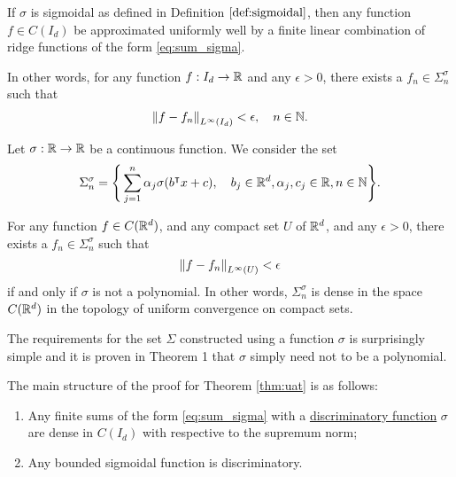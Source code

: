\begin{theorem}
    \label{thm:uat}
    If $\sigma$ is sigmoidal as defined in Definition $\ref{def:sigmoidal}$,
    then any function $f \in C(I_d)$ be approximated uniformly well by a finite
    linear combination of ridge functions of the form \eqref{eq:sum_sigma}.

    In other words, for any function $f: I_d \to \mathbb{R}$ and any $\epsilon > 0$,
    there exists a $f_n \in \Sigma_n^{\sigma}$ such that
    \begin{align}
        \left\| f - f_n \right\|_{L^{\infty}(I_d)} < \epsilon, \quad n \in \mathbb{N}.
    \end{align}
\end{theorem}

\begin{proposition}
    Let $\sigma: \mathbb{R} \to \mathbb{R}$ be a continuous function. We consider the set
    \begin{equation}
        \Sigma_n^{\sigma} = \Bigg\{
            \sum_{j=1}^n \alpha_j \sigma(b{}^{\intercal} x + c), \quad
            b_j \in \mathbb{R}^d, \alpha_j, c_j \in \mathbb{R}, n\in\mathbb{N}
        \Bigg\}.
    \end{equation}

    For any function $f \in C(\mathbb{R}^d)$, and any compact set $U$ of $\mathbb{R}^d$, and any
    $\epsilon > 0$, there exists a $f_n \in \Sigma_n^{\sigma}$ such that 
    \begin{equation}
        \left\| f - f_n \right\|_{L^{\infty}(U)} < \epsilon
    \end{equation}
    if and only if $\sigma$ is not a polynomial. In other words,
    $\Sigma_n^{\sigma}$ is dense in the space $C(\mathbb{R}^d)$ in the topology of
    uniform convergence on compact sets.
\end{proposition}

\begin{remark}
    The requirements for the set $\Sigma$ constructed using a function $\sigma$
    is surprisingly simple and it is proven in Theorem 1
    \cite[p. 10]{leshnoMultilayerFeedforwardNetworks1993} that $\sigma$ simply need not
    to be a polynomial.
\end{remark}

The main structure of the proof for Theorem \ref{thm:uat} is as follows:
\begin{enumerate}
    \item Any finite sums of the form \eqref{eq:sum_sigma} with a
    \hyperref[def:dis_func]{discriminatory function} $\sigma$ are dense in
    $C(I_d)$ with respective to the supremum norm;
    \item Any bounded sigmoidal function is discriminatory.
\end{enumerate}

